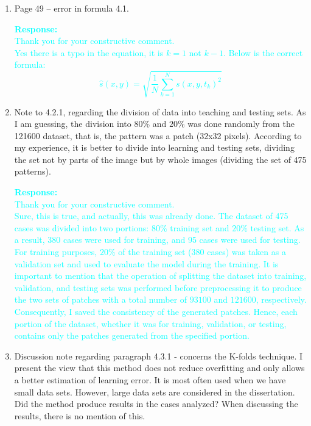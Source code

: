 \documentclass[11pt,a2paper]{report}
\begin{document}
{\begin{enumerate}
		\item Page 49 – error in formula 4.1.
		
		\textcolor{Cyan}{
			\textbf{Response:} \\
			Thank you for your constructive comment. \\
			Yes there is a typo in the equation, it is \(k=1\) not \(k-1\).
			Below is the correct formula:
			\begin{equation*}
				\hat{s}(x,y) = \sqrt{\frac{1}{N}\sum_{k=1}^{N}s(x,y,t_k)^2} 
				\label{eqn:rms} 
			\end{equation*}
		}		
	
		\item Note to 4.2.1, regarding the division of data into teaching and testing sets. 
		As I am guessing, the division into \(80\%\) and \(20\%\) was done randomly from the 121600 dataset, that is, the pattern was a patch (32x32 pixels). 
		According to my experience, it is better to divide into learning and testing sets, dividing the set not by parts of the image but by whole images (dividing the set of 475 patterns).
		
		\textcolor{Cyan}{
			\textbf{Response:} \\
			Thank you for your constructive comment. \\
			Sure, this is true, and actually, this was already done.
			The dataset of 475 cases was divided into two portions: $80\%$ training set and $20\%$ testing set.
			As a result, 380 cases were used for training, and 95 cases were used for testing.
			For training purposes, \(20\%\) of the training set (\(380\) cases) was taken as a validation set and used to evaluate the model during the training.
			It is important to mention that the operation of splitting the dataset into training, validation, and testing sets was performed before preprocessing it to produce the two sets of patches with a total number of \(93100\) and \(121600\), respectively.
			Consequently, I saved the consistency of the generated patches.
			Hence, each portion of the dataset, whether it was for training, validation, or testing, contains only the patches generated from the specified portion.
		}
	
		\item Discussion note regarding paragraph 4.3.1 - concerns the K-folds technique. 
		I present the view that this method does not reduce overfitting and only allows a better estimation of learning error. 
		It is most often used when we have small data sets. 
		However, large data sets are considered in the dissertation. 
		Did the method produce results in the cases analyzed? When discussing the results, there is no mention of this.
		

\end{enumerate}}
\end{document}
